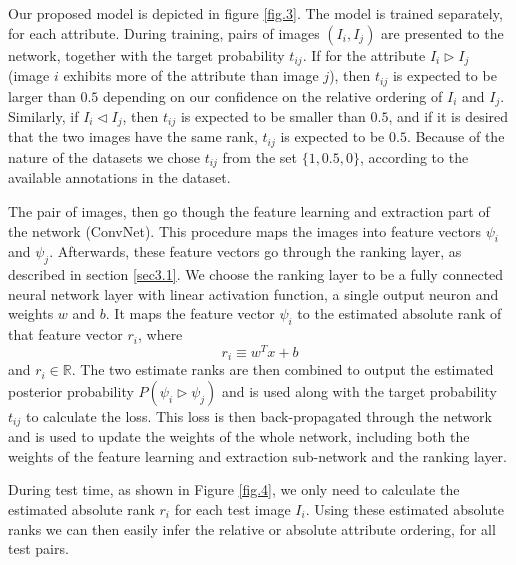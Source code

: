 Our proposed model is depicted in figure \ref{fig.3}. The model is trained separately, for each attribute. During training, pairs of images $(I_i, I_j)$ are presented to the network, together with the target probability $t_{ij}$. If for the attribute $I_i \triangleright I_j$ (image $i$ exhibits more of the attribute than image $j$), then $t_{ij}$ is expected to be larger than $0.5$ depending on our confidence on the relative ordering of $I_i$ and $I_j$. Similarly, if $I_i \triangleleft I_j$, then $t_{ij}$ is expected to be smaller than $0.5$, and if it is desired that the two images have the same rank, $t_{ij}$ is expected to be $0.5$. Because of the nature of the datasets we chose $t_{ij}$ from the set $\{1, 0.5, 0 \}$, according to the available annotations in the dataset.

The pair of images, then go though the feature learning and extraction part of the network (ConvNet). This procedure maps the images into feature vectors $\psi_i$ and $\psi_j$. Afterwards, these feature vectors go through the ranking layer, as described in section \ref{sec3.1}. We choose the ranking layer to be a fully connected neural network layer with linear activation function, a single output neuron and weights $w$ and $b$. It maps the feature vector $\psi_i$ to the estimated absolute rank of that feature vector $r_i$, where
$$
r_i \equiv w^T x + b
$$
and $r_i \in \mathbb{R}$.
The two estimate ranks are then combined to output the estimated posterior probability $P(\psi_i \triangleright \psi_j)$ and is used along with the target probability $t_{ij}$ to calculate the loss. This loss is then back-propagated through the network and is used to update the weights of the whole network, including both the weights of the feature learning and extraction sub-network and the ranking layer.

During test time, as shown in Figure \ref{fig.4}, we only need to calculate the estimated absolute rank $r_i$ for each test image $I_i$. Using these estimated absolute ranks we can then easily infer the relative or absolute attribute ordering, for all test pairs.